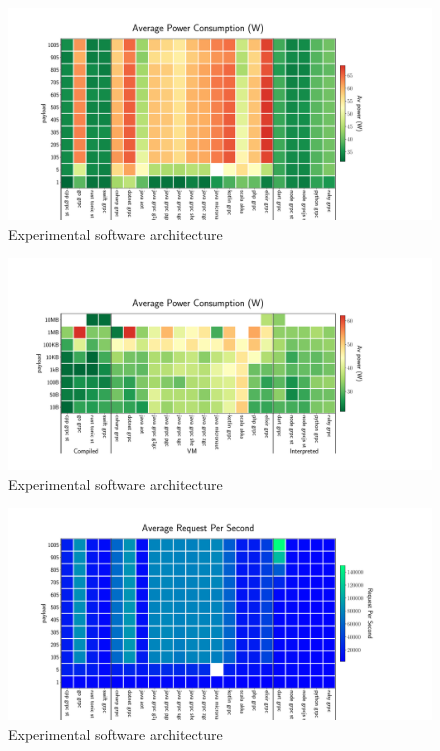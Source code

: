 \begin{figure}[!hbt]
    \begin{center}
        \includegraphics[width=1.2\linewidth]{imgs/rpc_images/power_consumption_clients}
    \end{center}
    \caption{Experimental software architecture}\label{fig:power_consumption_clients}
\end{figure}


\begin{figure}[!hbt]
    \begin{center}
        \includegraphics[width=1.2\linewidth]{imgs/rpc_images/power_consumption_payload}
    \end{center}
    \caption{Experimental software architecture}\label{fig:power_consumption_payload}
\end{figure}

\begin{figure}[!hbt]
    \begin{center}
        \includegraphics[width=1.2\linewidth]{imgs/rpc_images/rps_clients}
    \end{center}
    \caption{Experimental software architecture}\label{fig:rps_clients}
\end{figure}

